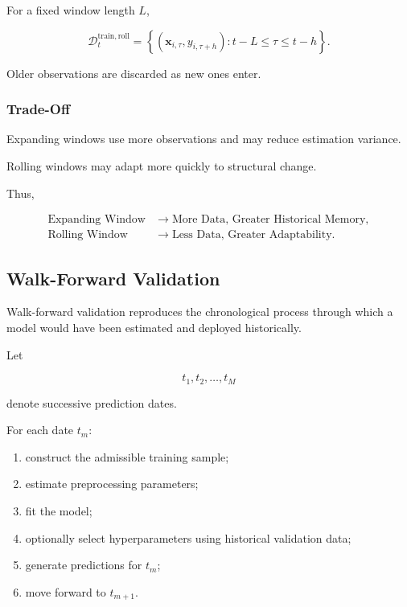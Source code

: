 \documentclass[11pt,a4paper]{article}
\begin{document}
For a fixed window length $L$,

\begin{equation}
\boxed{
\mathcal{D}_t^{\mathrm{train,roll}}
=
\left\{
(\mathbf{x}_{i,\tau},y_{i,\tau+h})
:
t-L
\leq
\tau
\leq
t-h
\right\}.
}
\end{equation}

Older observations are discarded as new ones enter.


\subsubsection{Trade-Off}

Expanding windows use more observations and may reduce estimation variance.

Rolling windows may adapt more quickly to structural change.

Thus,

\begin{equation}
\boxed{
\begin{aligned}
\text{Expanding Window}
&\rightarrow
\text{More Data, Greater Historical Memory},
\\
\text{Rolling Window}
&\rightarrow
\text{Less Data, Greater Adaptability}.
\end{aligned}
}
\end{equation}


\subsection{Walk-Forward Validation}
\label{subsec:walk_forward_validation}

Walk-forward validation reproduces the chronological process through which a
model would have been estimated and deployed historically.

Let

\begin{equation}
t_1,
t_2,
\ldots,
t_M
\end{equation}

denote successive prediction dates.

For each date $t_m$:

\begin{enumerate}
    \item construct the admissible training sample;
    \item estimate preprocessing parameters;
    \item fit the model;
    \item optionally select hyperparameters using historical validation data;
    \item generate predictions for $t_m$;
    \item move forward to $t_{m+1}$.
\end{enumerate}
\end{document}
